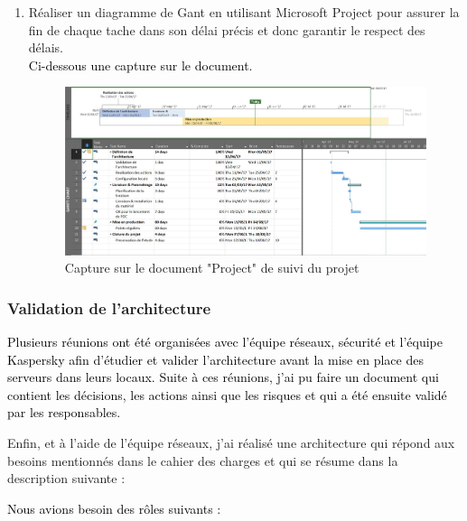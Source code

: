 \begin{enumerate}
\item Réaliser un diagramme de Gant en utilisant Microsoft Project pour assurer la fin de chaque tache dans son délai précis et donc garantir le respect des délais.
~~\\
\textcolor{black}{Ci-dessous une capture sur le document.}
\begin{figure}[H]
	\begin{center}
		\includegraphics[width=1\linewidth]{Projet_KATA/MSproject}
\end{center}
	\caption{Capture sur le document "Project" de suivi du projet }
	\label{fig:5}	
\end{figure}		 
		 
\end{enumerate}
\vspace{0.5cm}
\subsubsection{Validation de l’architecture}
\vspace{0.5cm}
\textcolor{black}{Plusieurs réunions ont été organisées avec l’équipe réseaux, sécurité et l’équipe Kaspersky afin d’étudier et valider l’architecture avant la mise en place des serveurs dans leurs locaux.}
\textcolor{black}{Suite à ces réunions, j’ai pu faire un document qui contient les décisions, les actions ainsi que les risques et qui a été ensuite validé par les responsables.}

\textcolor{blck}{ Enfin, et à l’aide de l’équipe réseaux, j’ai réalisé une architecture qui répond aux besoins mentionnés dans le cahier des charges et qui se résume dans la description suivante :}
\vspace{0.5cm}

\textcolor{black}{Nous avions besoin des rôles suivants :}

